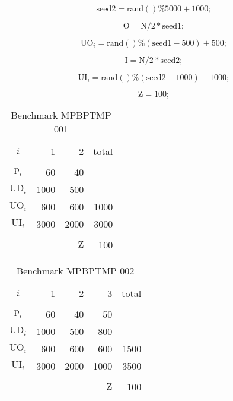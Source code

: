 \documentclass[authoryear,preprint,12pt]{elsarticle}
\begin{document}
\begin{equation}
\textrm{seed2} = \textrm{rand}()\%5000 + 1000;
\end{equation}

\begin{equation}
\textrm{O} = \textrm{N}/2*\textrm{seed1};
\end{equation}

\begin{equation}
\textrm{UO}_i = \textrm{rand}()\%(\textrm{seed1}-500) + 500;
\end{equation}

\begin{equation}
\textrm{I} = \textrm{N}/2*\textrm{seed2};
\end{equation}

\begin{equation}
\textrm{UI}_i = \textrm{rand}()\%(\textrm{seed2}-1000) + 1000;
\end{equation}

\begin{equation}
\textrm{Z} = 100;
\end{equation}


\begin{table}[h]
\begin{center}
\begin{tabular}[c]{c r r r}
$i$ & 1 & 2 & total \\
\cline {1-4} \\
$\textrm{p}_i$ & 60 & 40 & \\
$\textrm{UD}_i$ & 1000 & 500 & \\
$\textrm{UO}_i$ & 600 & 600 & 1000 \\
$\textrm{UI}_i$ & 3000 & 2000 & 3000 \\
\cline {1-4} \\
& & $\textrm{Z}$ & 100 \\
\end{tabular}
\caption{Benchmark MPBPTMP 001}
\label{tab:MBPTMP001}
\end{center}
\end{table}

\begin{table}[h]
\begin{center}
\begin{tabular}[c]{c r r r r}
$i$ & 1 & 2 & 3 & total \\
\cline {1-5} \\
$\textrm{p}_i$ & 60 & 40 & 50 \\
$\textrm{UD}_i$ & 1000 & 500 & 800 \\
$\textrm{UO}_i$ & 600 & 600 & 600 & 1500 \\
$\textrm{UI}_i$ & 3000 & 2000 & 1000 & 3500 \\
\cline {1-5} \\
& & & $\textrm{Z}$ & 100 \\
\end{tabular}
\caption{Benchmark MPBPTMP 002}
\label{tab:MBPTMP002}
\end{center}
\end{table}
\end{document}
